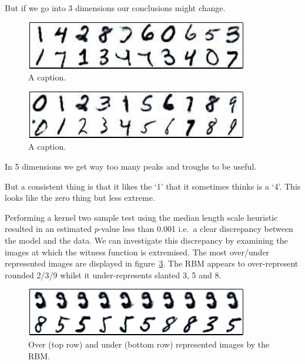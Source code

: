 \documentclass{article} %
\def\ie{i.e.\ }
\begin{document}
But if we go into 3 dimensions our conclusions might change.

\begin{figure}[ht]
\centering
\includegraphics[width=0.98\columnwidth]{figures/dbn_ft_3_witness_peaks}
\caption{
A caption.
}
\label{fig:dbn_ft_witness_peaks}
\end{figure}

\begin{figure}[ht]
\centering
\includegraphics[width=0.98\columnwidth]{figures/dbn_ft_3_cond}
\caption{
A caption.
}
\label{fig:dbn_ft_cond}
\end{figure}

In 5 dimensions we get way too many peaks and troughs to be useful.

But a consistent thing is that it likes the `1' that it sometimes thinks is a `4'.
This looks like the zero thing but less extreme.


Performing a kernel two sample test using the median length scale heuristic resulted in an estimated $p$-value less than 0.001 \ie a clear discrepancy between the model and the data.
We can investigate this discrepancy by examining the images at which the witness function is extremised.
The most over/under represented images are displayed in figure~\ref{fig:rbm_over_under}.
The RBM appears to over-represent rounded 2/3/9 whilst it under-represents slanted 3, 5 and 8.

\begin{figure}[ht]
\centering
\includegraphics[width=0.98\columnwidth]{figures/rbm_over_under}
\caption{
Over (top row) and under (bottom row) represented images by the RBM.
}
\label{fig:rbm_over_under}
\end{figure}
\end{document}
